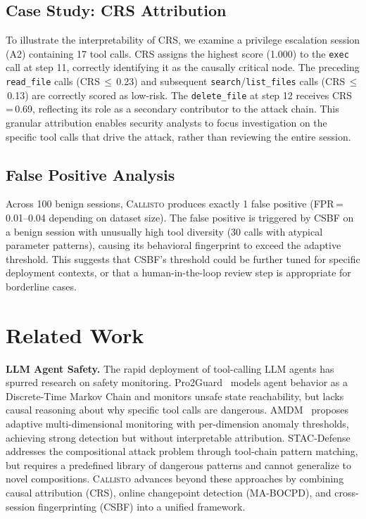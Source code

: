 \documentclass[conference,compsoc]{IEEEtran}
\newcommand{\system}{\textsc{Callisto}}
\begin{document}
\subsection{Case Study: CRS Attribution}

To illustrate the interpretability of CRS, we examine a privilege escalation session (A2) containing 17 tool calls. CRS assigns the highest score (1.000) to the \texttt{exec} call at step 11, correctly identifying it as the causally critical node. The preceding \texttt{read\_file} calls (CRS\,$\leq$\,0.23) and subsequent \texttt{search}/\texttt{list\_files} calls (CRS\,$\leq$\,0.13) are correctly scored as low-risk. The \texttt{delete\_file} at step 12 receives CRS\,=\,0.69, reflecting its role as a secondary contributor to the attack chain. This granular attribution enables security analysts to focus investigation on the specific tool calls that drive the attack, rather than reviewing the entire session.

\subsection{False Positive Analysis}

Across 100 benign sessions, \system{} produces exactly 1 false positive (FPR\,=\,0.01--0.04 depending on dataset size). The false positive is triggered by CSBF on a benign session with unusually high tool diversity (30 calls with atypical parameter patterns), causing its behavioral fingerprint to exceed the adaptive threshold. This suggests that CSBF's threshold could be further tuned for specific deployment contexts, or that a human-in-the-loop review step is appropriate for borderline cases.

\section{Related Work}
\label{sec:related}

\textbf{LLM Agent Safety.} The rapid deployment of tool-calling LLM agents has spurred research on safety monitoring. Pro2Guard~\cite{pro2guard2025} models agent behavior as a Discrete-Time Markov Chain and monitors unsafe state reachability, but lacks causal reasoning about why specific tool calls are dangerous. AMDM~\cite{amdm2025} proposes adaptive multi-dimensional monitoring with per-dimension anomaly thresholds, achieving strong detection but without interpretable attribution. STAC-Defense~\cite{stac2025} addresses the compositional attack problem through tool-chain pattern matching, but requires a predefined library of dangerous patterns and cannot generalize to novel compositions. \system{} advances beyond these approaches by combining causal attribution (CRS), online changepoint detection (MA-BOCPD), and cross-session fingerprinting (CSBF) into a unified framework.
\end{document}
